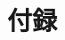 \documentclass[main]{subfiles}
\begin{document}
\appendix 
\chapter{付録}
\label{lst:sensor_unit_code}
\end{document}
